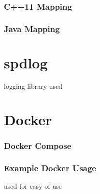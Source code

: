 \subsubsection{C++11 Mapping}
\subsubsection{Java Mapping}
\section{spdlog}
logging library used
\section{Docker}
\subsubsection{Docker Compose}
\subsubsection{Example Docker Usage}
used for easy of use